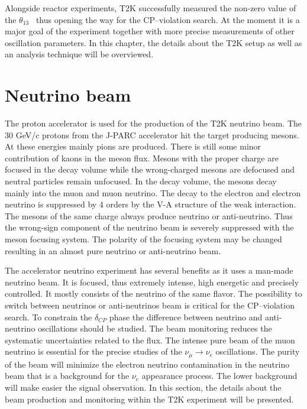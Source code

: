 \documentclass[../main.tex]{subfiles}
\begin{document}
Alongside reactor experiments, T2K successfully measured the non-zero value of the $\theta_{13}$~\cite{Abe2014a, An2012} thus opening the way for the CP--violation search. At the moment it is a major goal of the experiment together with more precise measurements of other oscillation parameters. In this chapter, the details about the T2K setup as well as an analysis technique will be overviewed.

\section{Neutrino beam}
\label{ch:T2K:nu_beam}

The proton accelerator is used for the production of the T2K neutrino beam. The 30 GeV/c protons from the J-PARC accelerator hit the target producing mesons. At these energies mainly pions are produced. There is still some minor contribution of kaons in the meson flux. Mesons with the proper charge are focused in the decay volume while the wrong-charged mesons are defocused and neutral particles remain unfocused. In the decay volume, the mesons decay mainly into the muon and muon neutrino. The decay to the electron and electron neutrino is suppressed by 4 orders by the V-A structure of the weak interaction. The mesons of the same charge always produce neutrino or anti-neutrino. Thus the wrong-sign component of the neutrino beam is severely suppressed with the meson focusing system. The polarity of the focusing system may be changed resulting in an almost pure neutrino or anti-neutrino beam.

The accelerator neutrino experiment has several benefits as it uses a man-made neutrino beam. It is focused, thus extremely intense, high energetic and precisely controlled. It mostly consists of the neutrino of the same flavor. The possibility to switch between neutrinos or anti-neutrinos beam is critical for the CP--violation search. To constrain the $\delta_{CP}$ phase the difference between neutrino and anti-neutrino oscillations should be studied. The beam monitoring reduces the systematic uncertainties related to the flux. The intense pure beam of the muon neutrino is essential for the precise studies of the $\nu_\mu\to\nu_e$ oscillations. The purity of the beam will minimize the electron neutrino contamination in the neutrino beam that is a background for the $\nu_e$ appearance process. The lower background will make easier the signal observation. In this section, the details about the beam production and monitoring within the T2K experiment will be presented.
\end{document}
